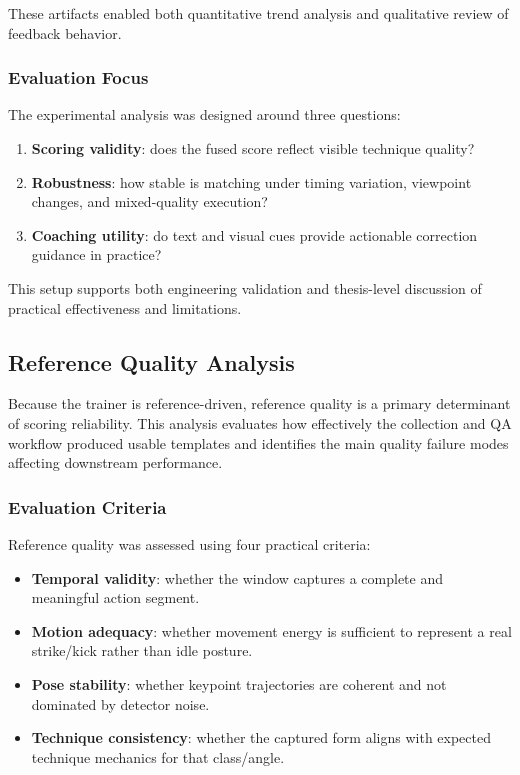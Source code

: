 \documentclass[12pt]{article}
\begin{document}
{These artifacts enabled both quantitative trend analysis and qualitative review of feedback behavior.

\subsubsection{Evaluation Focus}

The experimental analysis was designed around three questions:

\begin{enumerate}
    \item \textbf{Scoring validity}: does the fused score reflect visible technique quality?
    \item \textbf{Robustness}: how stable is matching under timing variation, viewpoint changes, and mixed-quality execution?
    \item \textbf{Coaching utility}: do text and visual cues provide actionable correction guidance in practice?
\end{enumerate}

This setup supports both engineering validation and thesis-level discussion of practical effectiveness and limitations.

\subsection{Reference Quality Analysis}

Because the trainer is reference-driven, reference quality is a primary determinant of scoring reliability. This analysis evaluates how effectively the collection and QA workflow produced usable templates and identifies the main quality failure modes affecting downstream performance.

\subsubsection{Evaluation Criteria}

Reference quality was assessed using four practical criteria:

\begin{itemize}
    \item \textbf{Temporal validity}: whether the window captures a complete and meaningful action segment.
    \item \textbf{Motion adequacy}: whether movement energy is sufficient to represent a real strike/kick rather than idle posture.
    \item \textbf{Pose stability}: whether keypoint trajectories are coherent and not dominated by detector noise.
    \item \textbf{Technique consistency}: whether the captured form aligns with expected technique mechanics for that class/angle.
\end{itemize}

}
\end{document}
